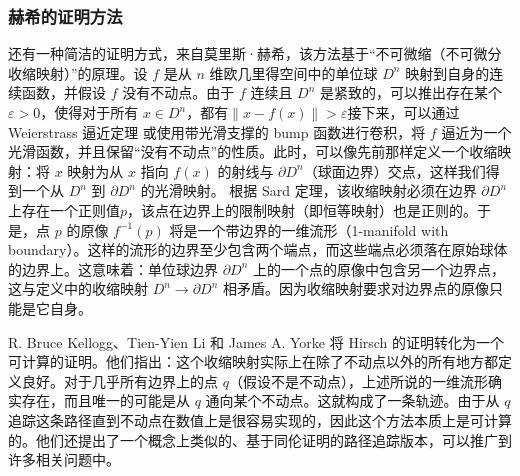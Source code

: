 \subsubsection{赫希的证明方法}
还有一种简洁的证明方式，来自莫里斯·赫希，该方法基于“不可微缩（不可微分收缩映射）”的原理。设 $f$ 是从 $n$ 维欧几里得空间中的单位球 $D^n$ 映射到自身的连续函数，并假设 $f$ 没有不动点。由于 $f$ 连续且 $D^n$ 是紧致的，可以推出存在某个 $\varepsilon > 0$，使得对于所有 $x \in D^n$，都有$\|x - f(x)\| > \varepsilon$接下来，可以通过 Weierstrass 逼近定理 或使用带光滑支撑的 bump 函数进行卷积，将 $f$ 逼近为一个光滑函数，并且保留“没有不动点”的性质。此时，可以像先前那样定义一个收缩映射：将 $x$ 映射为从 $x$ 指向 $f(x)$ 的射线与 $\partial D^n$（球面边界）交点，这样我们得到一个从 $D^n$ 到 $\partial D^n$ 的光滑映射。
根据 Sard 定理，该收缩映射必须在边界 $\partial D^n$ 上存在一个正则值$p$，该点在边界上的限制映射（即恒等映射）也是正则的。于是，点 $p$ 的原像 $f^{-1}(p)$ 将是一个带边界的一维流形（1-manifold with boundary）。这样的流形的边界至少包含两个端点，而这些端点必须落在原始球体的边界上。这意味着：单位球边界 $\partial D^n$ 上的一个点的原像中包含另一个边界点，这与定义中的收缩映射 $D^n \to \partial D^n$ 相矛盾。因为收缩映射要求对边界点的原像只能是它自身。

R. Bruce Kellogg、Tien-Yien Li 和 James A. Yorke 将 Hirsch 的证明转化为一个可计算的证明。他们指出：这个收缩映射实际上在除了不动点以外的所有地方都定义良好。对于几乎所有边界上的点 $q$（假设不是不动点），上述所说的一维流形确实存在，而且唯一的可能是从 $q$ 通向某个不动点。这就构成了一条轨迹。由于从 $q$ 追踪这条路径直到不动点在数值上是很容易实现的，因此这个方法本质上是可计算的。他们还提出了一个概念上类似的、基于同伦证明的路径追踪版本，可以推广到许多相关问题中。

